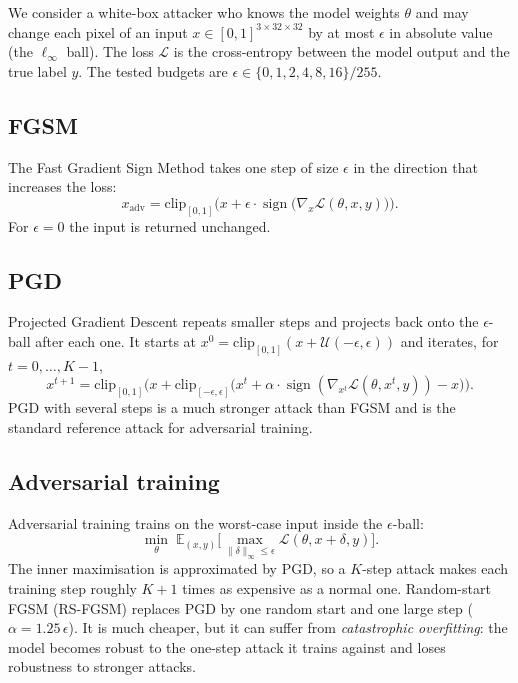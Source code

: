 \documentclass[twoside,a4paper,11pt]{article}
\begin{document}
We consider a white-box attacker who knows the model weights $\theta$ and
may change each pixel of an input $x \in [0,1]^{3 \times 32 \times 32}$
by at most $\epsilon$ in absolute value (the $\ell_\infty$ ball). The loss
$\mathcal{L}$ is the cross-entropy between the model output and the true
label $y$. The tested budgets are
$\epsilon \in \{0, 1, 2, 4, 8, 16\}/255$.

\subsection{FGSM}

The Fast Gradient Sign Method \cite{Goodfellow:15} takes one step of size
$\epsilon$ in the direction that increases the loss:
\begin{equation}
x_{\mathrm{adv}} = \mathrm{clip}_{[0,1]}\Big(x + \epsilon \cdot
\operatorname{sign}\big(\nabla_x \mathcal{L}(\theta, x, y)\big)\Big).
\end{equation}
For $\epsilon = 0$ the input is returned unchanged.

\subsection{PGD}

Projected Gradient Descent \cite{Madry:18} repeats smaller steps and
projects back onto the $\epsilon$-ball after each one. It starts at
$x^0 = \mathrm{clip}_{[0,1]}(x + \mathcal{U}(-\epsilon,\epsilon))$ and
iterates, for $t = 0,\dots,K-1$,
\begin{equation}
x^{t+1} = \mathrm{clip}_{[0,1]}\Big( x + \mathrm{clip}_{[-\epsilon,\epsilon]}
\big( x^t + \alpha \cdot \operatorname{sign}(\nabla_{x^t}
\mathcal{L}(\theta, x^t, y)) - x \big) \Big).
\end{equation}
PGD with several steps is a much stronger attack than FGSM and is the
standard reference attack for adversarial training.

\subsection{Adversarial training}

Adversarial training \cite{Madry:18} trains on the worst-case input
inside the $\epsilon$-ball:
\begin{equation}
\min_\theta \; \mathbb{E}_{(x,y)} \Big[ \max_{\|\delta\|_\infty \le \epsilon}
\mathcal{L}(\theta, x+\delta, y) \Big].
\end{equation}
The inner maximisation is approximated by PGD, so a $K$-step attack makes
each training step roughly $K+1$ times as expensive as a normal one.
Random-start FGSM (RS-FGSM) \cite{Wong:20} replaces PGD by one random
start and one large step ($\alpha = 1.25\,\epsilon$). It is much cheaper,
but it can suffer from \emph{catastrophic overfitting}: the model becomes
robust to the one-step attack it trains against and loses robustness to
stronger attacks.
\end{document}
